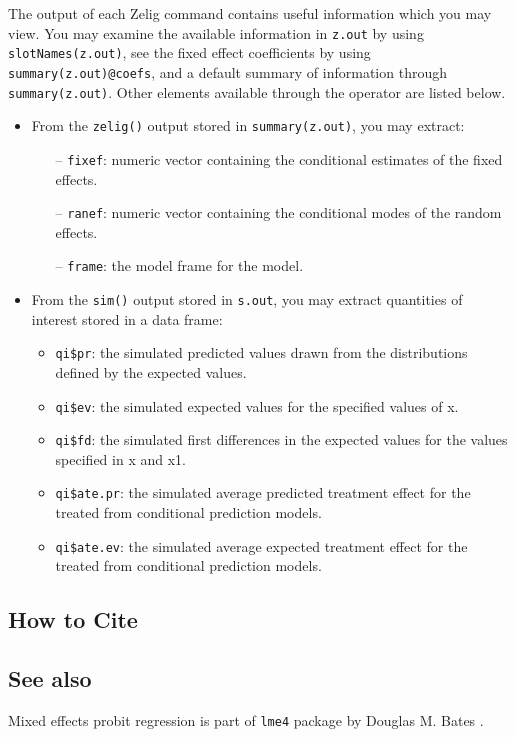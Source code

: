 The output of each Zelig command contains useful information which you may view. You may examine the available information in {\tt z.out} by using {\tt slotNames(z.out)}, see the fixed effect coefficients by using {\tt summary(z.out)@coefs}, and a default summary of information through {\tt summary(z.out)}. Other elements available through the {\tt \@} operator are listed below.
\begin{itemize}
\item From the {\tt zelig()} output stored in {\tt summary(z.out)}, you may extract:
\begin{itemize}
\item[--] {\tt fixef}: numeric vector containing the conditional estimates of the fixed effects.
\item[--] {\tt ranef}: numeric vector containing the conditional modes of the random effects.
\item[--] {\tt frame}: the model frame for the model.
\end{itemize}
\item From the {\tt sim()} output stored in {\tt s.out}, you may extract quantities of interest stored in a data frame:
\begin{itemize}
\item {\tt qi\$pr}: the simulated predicted values drawn from the distributions defined by the expected values.
\item {\tt qi\$ev}: the simulated expected values for the specified values of x.
\item {\tt qi\$fd}: the simulated first differences in the expected values for the values specified in x and x1.
\item {\tt qi\$ate.pr}: the simulated average predicted treatment effect for the treated from conditional prediction models.
\item {\tt qi\$ate.ev}: the simulated average expected treatment effect for the treated from conditional prediction models.
\end{itemize}
\end{itemize}



\subsection* {How to Cite}




\subsection* {See also}
Mixed effects probit regression is part of {\tt lme4} package by Douglas M. Bates \citep{Bates07}.
